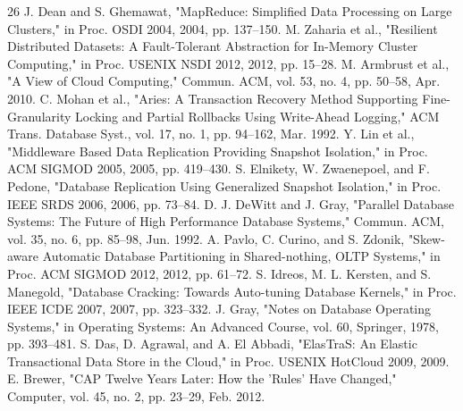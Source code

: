 \documentclass[conference]{IEEEtran}
\begin{document}
\begin{thebibliography}{26}
 J. Dean and S. Ghemawat, "MapReduce: Simplified Data Processing on Large Clusters," in Proc. OSDI 2004, 2004, pp. 137--150.
 M. Zaharia et al., "Resilient Distributed Datasets: A Fault-Tolerant Abstraction for In-Memory Cluster Computing," in Proc. USENIX NSDI 2012, 2012, pp. 15--28.
 M. Armbrust et al., "A View of Cloud Computing," Commun. ACM, vol. 53, no. 4, pp. 50--58, Apr. 2010.
 C. Mohan et al., "Aries: A Transaction Recovery Method Supporting Fine-Granularity Locking and Partial Rollbacks Using Write-Ahead Logging," ACM Trans. Database Syst., vol. 17, no. 1, pp. 94--162, Mar. 1992.
 Y. Lin et al., "Middleware Based Data Replication Providing Snapshot Isolation," in Proc. ACM SIGMOD 2005, 2005, pp. 419--430.
 S. Elnikety, W. Zwaenepoel, and F. Pedone, "Database Replication Using Generalized Snapshot Isolation," in Proc. IEEE SRDS 2006, 2006, pp. 73--84.
 D. J. DeWitt and J. Gray, "Parallel Database Systems: The Future of High Performance Database Systems," Commun. ACM, vol. 35, no. 6, pp. 85--98, Jun. 1992.
 A. Pavlo, C. Curino, and S. Zdonik, "Skew-aware Automatic Database Partitioning in Shared-nothing, OLTP Systems," in Proc. ACM SIGMOD 2012, 2012, pp. 61--72.
 S. Idreos, M. L. Kersten, and S. Manegold, "Database Cracking: Towards Auto-tuning Database Kernels," in Proc. IEEE ICDE 2007, 2007, pp. 323--332.
 J. Gray, "Notes on Database Operating Systems," in Operating Systems: An Advanced Course, vol. 60, Springer, 1978, pp. 393--481.
 S. Das, D. Agrawal, and A. El Abbadi, "ElasTraS: An Elastic Transactional Data Store in the Cloud," in Proc. USENIX HotCloud 2009, 2009.
 E. Brewer, "CAP Twelve Years Later: How the 'Rules' Have Changed," Computer, vol. 45, no. 2, pp. 23--29, Feb. 2012.
\end{thebibliography}
\vspace{12pt}
\end{document}
